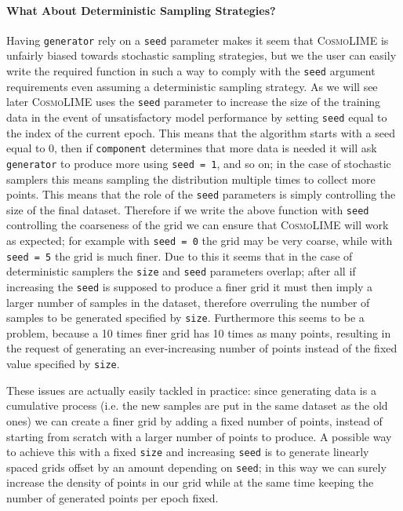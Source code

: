 \paragraph{What About Deterministic Sampling Strategies?}
Having \texttt{generator} rely on a \texttt{seed} parameter makes it seem that \textsc{CosmoLIME} is unfairly biased towards stochastic sampling strategies, but we the user can easily write the required function in such a way to comply with the \texttt{seed} argument requirements even assuming a deterministic sampling strategy. As we will see later \textsc{CosmoLIME} uses the \texttt{seed} parameter to increase the size of the training data in the event of unsatisfactory model performance by setting \texttt{seed} equal to the index of the current epoch. This means that the algorithm starts with a seed equal to 0, then if \texttt{component} determines that more data is needed it will ask \texttt{generator} to produce more using \texttt{seed = 1}, and so on; in the case of stochastic samplers this means sampling the distribution multiple times to collect more points. This means that the role of the \texttt{seed} parameters is simply controlling the size of the final dataset. Therefore if we write the above function with \texttt{seed} controlling the coarseness of the grid we can ensure that \textsc{CosmoLIME} will work as expected; for example with \texttt{seed = 0} the grid may be very coarse, while with \texttt{seed = 5} the grid is much finer. 
Due to this it seems that in the case of deterministic samplers the \texttt{size} and \texttt{seed} parameters overlap; after all if increasing the \texttt{seed} is supposed to produce a finer grid it must then imply a larger number of samples in the dataset, therefore overruling the number of samples to be generated specified by \texttt{size}. Furthermore this seems to be a problem, because a 10 times finer grid has 10 times as many points, resulting in the request of generating an ever-increasing number of points instead of the fixed value specified by \texttt{size}.

These issues are actually easily tackled in practice: since generating data is a cumulative process (i.e. the new samples are put in the same dataset as the old ones) we can create a finer grid by adding a fixed number of points, instead of starting from scratch with a larger number of points to produce. A possible way to achieve this with a fixed \texttt{size} and increasing \texttt{seed} is to generate linearly spaced grids offset by an amount depending on \texttt{seed}; in this way we can surely increase the density of points in our grid while at the same time keeping the number of generated points per epoch fixed.

